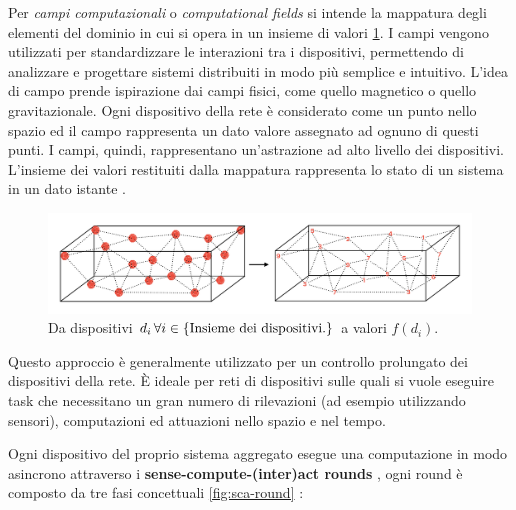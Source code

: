 \documentclass[12pt,a4paper,openright,twoside]{book}
\begin{document}

Per \textit{campi computazionali} o \textit{computational fields} si intende la mappatura degli elementi del dominio in cui si opera in un insieme di valori \cref{fig:device-to-value}.
I campi vengono utilizzati per standardizzare le interazioni tra i dispositivi, permettendo di analizzare e progettare sistemi distribuiti in modo più semplice e intuitivo. L'idea di campo prende ispirazione dai campi fisici, come quello magnetico o quello gravitazionale. Ogni dispositivo della rete è considerato come un punto nello spazio ed il campo rappresenta un dato valore assegnato ad ognuno di questi punti. I campi, quindi, rappresentano un'astrazione ad alto livello dei dispositivi. L'insieme dei valori restituiti dalla mappatura rappresenta lo stato di un sistema in un dato istante \cite{Audrito2019}.

\begin{figure}
    \centering
    \includegraphics[width=.9\linewidth]{figures/device-to-value.pdf}
    \caption{Da dispositivi $d_i \thinspace \forall i \in {\text{\{Insieme dei dispositivi.\}}}$ a valori $f(d_i)$.}
    \label{fig:device-to-value}
\end{figure}

Questo approccio è generalmente utilizzato per un controllo prolungato dei dispositivi della rete. È ideale per reti di dispositivi sulle quali si vuole eseguire task che necessitano un gran numero di rilevazioni (ad esempio utilizzando sensori), computazioni ed attuazioni nello spazio e nel tempo.

Ogni dispositivo del proprio sistema aggregato esegue una computazione in modo asincrono attraverso i \textbf{sense-compute-(inter)act rounds}\label{sec:sense-compute-interact} \cite{Macroswarm}, ogni round è composto da tre fasi concettuali \cref{fig:sca-round} \cite{Casadei2021-2}:
\end{document}
